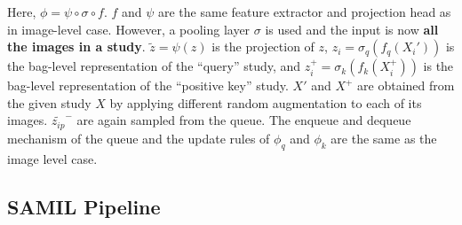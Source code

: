 
Here, $\phi = \psi \circ \sigma \circ f$. $f$ and $\psi$ are the same feature extractor and projection head as in image-level case. However, a pooling layer $\sigma$ is used and the input is now \textbf{all the images in a study}. $\tilde{z}=\psi(z)$ is the projection of $z$, $z_{i} = \sigma_q(f_q(X_i'))$ is the bag-level representation of the ``query'' study, and $z_{i}^{+} = \sigma_k(f_k(X_i^{+}))$ is the bag-level representation of the ``positive key'' study.
$X'$ and $X^+$ are obtained from the given study $X$ by applying different random augmentation to each of its images. 
$\tilde{z_{ip}}^{-}$ are again sampled from the queue. The enqueue and dequeue mechanism of the queue and the update rules of $\phi_q$ and $\phi_k$ are the same as the image level case. 






\subsection{SAMIL Pipeline}


